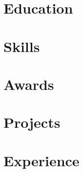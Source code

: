 \documentclass[]{deedy-resume-openfont}
\begin{document}
	\begin{minipage}[t]{0.33\textwidth}

		\section{Education}
		\begin{education}
		\end{education}
		\sectionsep


		\section{Skills}
		\begin{skills}
		\end{skills}
		\sectionsep


		\section{Awards}
		\begin{awards}
		\end{awards}
		\sectionsep

	\end{minipage}
	\hfill
	\begin{minipage}[t]{0.66\textwidth}
		\section{Projects}
		\begin{projects}
		\end{projects}
		\sectionsep

	\end{minipage}

	\begin{minipage}[t]{1\textwidth}
		\section{Experience}
		\begin{experience}
		\end{experience}
		\sectionsep
	\end{minipage}
\end{document}

